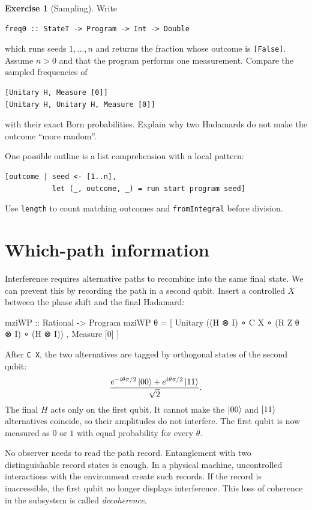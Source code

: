 \documentclass[11pt,a4paper]{article}
\theoremstyle{definition}
\newtheorem{exercise}{Exercise}[section]
\begin{document}
\begin{exercise}[Sampling]
Write
\begin{lstlisting}
freq0 :: StateT -> Program -> Int -> Double
\end{lstlisting}
which runs seeds $1,\ldots,n$ and returns the fraction whose outcome is
\lstinline|[False]|.  Assume $n>0$ and that the program performs one
measurement.  Compare the sampled frequencies of
\begin{lstlisting}
[Unitary H, Measure [0]]
[Unitary H, Unitary H, Measure [0]]
\end{lstlisting}
with their exact Born probabilities.  Explain why two Hadamards do not make
the outcome ``more random''.

One possible outline is a list comprehension with a local pattern:
\begin{lstlisting}
[outcome | seed <- [1..n],
           let (_, outcome, _) = run start program seed]
\end{lstlisting}
Use \lstinline|length| to count matching outcomes and
\lstinline|fromIntegral| before division.
\end{exercise}

\noindent\begin{minipage}{\textwidth}
\section{Which-path information}
\label{sec:whichpath}

Interference requires alternative paths to recombine into the same final
state.  We can prevent this by recording the path in a second qubit.  Insert
a controlled $X$ between the phase shift and the final Hadamard:
\begin{qppcode}
mziWP :: Rational -> Program
mziWP θ =
  [ Unitary ((H ⊗ I) ∘ C X ∘ (R Z θ ⊗ I) ∘ (H ⊗ I))
  , Measure [0]
  ]
\end{qppcode}
\end{minipage}
After \lstinline|C X|, the two alternatives are tagged by orthogonal states
of the second qubit:
\[
  \frac{e^{-i\theta\pi/2}\left| 00 \right\rangle
        +e^{i\theta\pi/2}\left| 11 \right\rangle}{\sqrt2}.
\]
The final $H$ acts only on the first qubit.  It cannot make the $\left| 00 \right\rangle$
and $\left| 11 \right\rangle$ alternatives coincide, so their amplitudes do not interfere.
The first qubit is now measured as $0$ or $1$ with equal probability for
every $\theta$.

No observer needs to read the path record.  Entanglement with two
distinguishable record states is enough.  In a physical machine, uncontrolled
interactions with the environment create such records.  If the record is
inaccessible, the first qubit no longer displays interference.  This loss of
coherence in the subsystem is called \emph{decoherence}.
\end{document}
